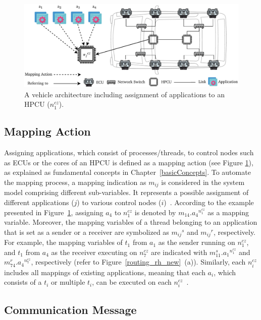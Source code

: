 \begin{figure}[t]
	\centering
	\includegraphics[width=1\columnwidth]{figures/mapping_action.pdf}
	\caption{A vehicle architecture including assignment of applications to an HPCU ($n_{1}^{cz}$).  
	}
	\label{mapping}
    \end{figure}

    \subsection{Mapping Action}
    Assigning applications, which consist of processes/threads, to control nodes such as ECUs or the cores of an HPCU is defined as a mapping action (see Figure \ref{mapping}), as explained as fundamental concepts in Chapter~\ref{basicConcepts}. To automate the mapping process, a mapping indication as $m_{ij}$ is considered in the system model comprising different sub-variables. It represents a possible assignment of different applications ($j$) to various control nodes ($i$)~\cite{askaripoor2023designer}. 
    According to the example presented in Figure~\ref{mapping}, assigning $a_4$ to $n_{1}^{cz}$ is denoted by ${m_{14}}.{a_4}^{n_{1}^{cz}}$ as a mapping variable. Moreover, the mapping variables of a thread belonging to an application that is set as a sender or a receiver are symbolized as ${m_{ij}}^{s}$ and ${m_{ij}}^{r}$, respectively. For example, the mapping variables of $t_1$ from $a_1$ as the sender running on $n_{1}^{cz}$, and $t_1$ from $a_4$ as the receiver executing on $n_{7}^{cz}$ are indicated with $m_{11}^{s}.{a_1}^{n_1^{cz}}$ and $m_{74}^{r}.{a_4}^{n_7^{cz}}$, respectively (refer to Figure~\ref{routing_rh_new}~(a)). Similarly, each $n_{i}^{cz}$ includes all mappings of existing applications, meaning that each $a_i$, which consists of a $t_i$ or multiple $t_i$, can be executed on each $n_{i}^{cz}$~\cite{askaripoor2023designer}.

    \subsection{Communication Message}

